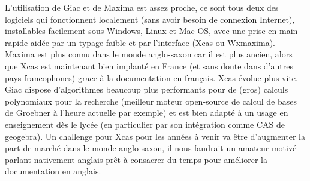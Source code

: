 \documentclass[a4paper,11pt]{book}
\begin{document}
\begin{giacjshere}
L'utilisation de Giac et de Maxima est assez proche, ce sont
tous deux des logiciels qui fonctionnent localement (sans
avoir besoin de connexion Internet),
installables facilement sous Windows, Linux
et Mac OS, avec une prise en main rapide
aid\'ee par un typage faible et par l'interface
(Xcas ou Wxmaxima). Maxima est plus connu dans le monde anglo-saxon
car il est plus ancien, alors que Xcas est maintenant bien
implant\'e en France (et sans doute dans d'autres pays francophones)
grace \`a la documentation en fran\c{c}ais. Xcas \'evolue plus vite.
Giac dispose d'algorithmes beaucoup plus
performants pour de (gros) calculs polynomiaux pour la recherche
(meilleur moteur open-source de calcul de bases de Groebner 
\`a l'heure actuelle par exemple)
et est bien adapt\'e \`a un usage
en enseignement d\`es le lyc\'ee (en particulier 
par son int\'egration comme CAS de geogebra). Un challenge pour Xcas
pour les ann\'ees \`a venir va \^etre d'augmenter la part
de march\'e dans le monde anglo-saxon, il nous faudrait
un amateur motiv\'e parlant nativement anglais pr\^et \`a consacrer
du temps pour am\'eliorer la documentation en anglais.


\end{giacjshere}
\end{document}
